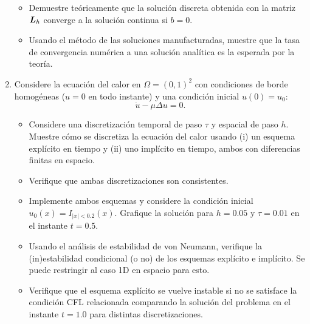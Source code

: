 \documentclass{article}
\newcommand{\mat}{\matrixsym}
\newcommand{\pts}[1]{[{\bf #1 puntos}]}
\begin{document}
\begin{enumerate}
\begin{itemize}
                \item\pts{2} Demuestre teóricamente que la solución discreta obtenida con la matriz $\mat L_h$ converge a la solución continua si $b=0$. 
                \item\pts{2} Usando el método de las soluciones manufacturadas, muestre que la tasa de convergencia numérica a una solución analítica es la esperada por la teoría. 
            \end{itemize}
    \item Considere la ecuación del calor en $\Omega = (0,1)^2$ con condiciones de borde homogéneas ($u=0$ en todo instante) y una condición inicial $u(0)=u_0$:
            $$ \dot u - \mu \Delta u = 0 . $$
            \begin{itemize}
                \item\pts{1} Considere una discretización temporal de paso $\tau$ y espacial de paso $h$. Muestre cómo se discretiza la ecuación del calor usando (i) un esquema explícito en tiempo y (ii) uno implícito en tiempo, ambos con diferencias finitas en espacio.
                \item\pts{2} Verifique que ambas discretizaciones son consistentes. 
                \item\pts{3} Implemente ambos esquemas y considere la condición inicial $u_0(x) = I_{|x| < 0.2}(x)$. Grafique la solución para $h=0.05$ y $\tau=0.01$ en el instante $t=0.5$. 
                \item\pts{2} Usando el análisis de estabilidad de von Neumann, verifique la (in)estabilidad condicional (o no) de los esquemas explícito e implícito. Se puede restringir al caso 1D en espacio para esto. 
                \item\pts{2} Verifique que el esquema explícito se vuelve instable si no se satisface la condición CFL relacionada comparando la solución del problema en el instante $t=1.0$ para distintas discretizaciones.
            \end{itemize}
\end{enumerate}

\end{document}
